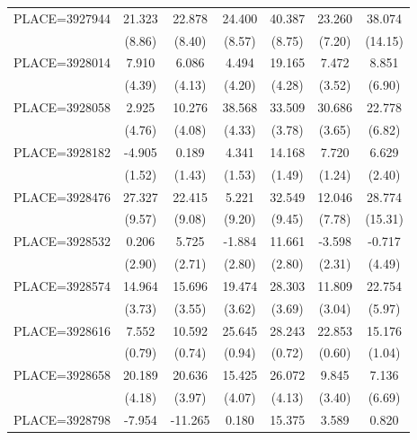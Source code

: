 {\begin{tabular}{l*{6}{c}}
PLACE=3927944       &      21.323&      22.878&      24.400&      40.387&      23.260&      38.074\\
                    &      (8.86)&      (8.40)&      (8.57)&      (8.75)&      (7.20)&     (14.15)\\
PLACE=3928014       &       7.910&       6.086&       4.494&      19.165&       7.472&       8.851\\
                    &      (4.39)&      (4.13)&      (4.20)&      (4.28)&      (3.52)&      (6.90)\\
PLACE=3928058       &       2.925&      10.276&      38.568&      33.509&      30.686&      22.778\\
                    &      (4.76)&      (4.08)&      (4.33)&      (3.78)&      (3.65)&      (6.82)\\
PLACE=3928182       &      -4.905&       0.189&       4.341&      14.168&       7.720&       6.629\\
                    &      (1.52)&      (1.43)&      (1.53)&      (1.49)&      (1.24)&      (2.40)\\
PLACE=3928476       &      27.327&      22.415&       5.221&      32.549&      12.046&      28.774\\
                    &      (9.57)&      (9.08)&      (9.20)&      (9.45)&      (7.78)&     (15.31)\\
PLACE=3928532       &       0.206&       5.725&      -1.884&      11.661&      -3.598&      -0.717\\
                    &      (2.90)&      (2.71)&      (2.80)&      (2.80)&      (2.31)&      (4.49)\\
PLACE=3928574       &      14.964&      15.696&      19.474&      28.303&      11.809&      22.754\\
                    &      (3.73)&      (3.55)&      (3.62)&      (3.69)&      (3.04)&      (5.97)\\
PLACE=3928616       &       7.552&      10.592&      25.645&      28.243&      22.853&      15.176\\
                    &      (0.79)&      (0.74)&      (0.94)&      (0.72)&      (0.60)&      (1.04)\\
PLACE=3928658       &      20.189&      20.636&      15.425&      26.072&       9.845&       7.136\\
                    &      (4.18)&      (3.97)&      (4.07)&      (4.13)&      (3.40)&      (6.69)\\
PLACE=3928798       &      -7.954&     -11.265&       0.180&      15.375&       3.589&       0.820\\

\end{tabular}}
